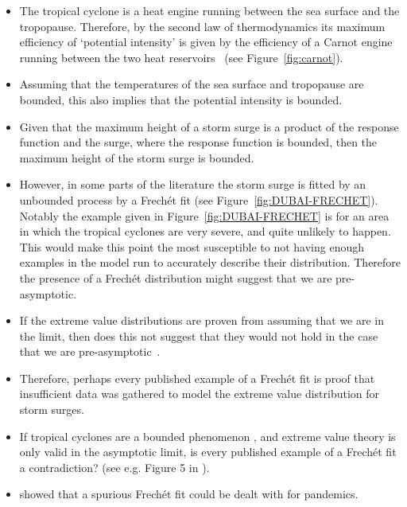 \documentclass[usenames, dvipsnames]{article}      %
\begin{document}
\begin{itemize}
    \item The tropical cyclone is a heat engine running between the 
          sea surface and the tropopause. Therefore, by the second law of
          thermodynamics its maximum efficiency of `potential intensity'
          is given by the efficiency of a Carnot engine running between
          the two heat reservoirs~\cite{emanuel1986air, emanuel1987dependence}
          (see Figure~\ref{fig:carnot}).
    
    \item Assuming that the temperatures of the sea surface
          and tropopause are bounded, this also implies that
          the potential intensity is bounded.
    
    \item Given that the maximum height of a storm surge is
          a product of the response function and the surge, 
          where the response function is bounded, then the
          maximum height of the storm surge is bounded.
    
    \item However, in some parts of the literature the storm surge
        is fitted by an unbounded process by a Frech\'et fit (see Figure~\ref{fig:DUBAI-FRECHET}).
        Notably the example given in Figure~\ref{fig:DUBAI-FRECHET}
        is for an area in which the tropical cyclones are very severe,
        and quite unlikely to happen.
        This would make this point the most susceptible to not having 
        enough examples in the model run to accurately
        describe their distribution. Therefore the presence of 
        a Frech\'et distribution might suggest that we are pre-asymptotic.
    
    \item If the extreme value distributions are proven from assuming that
        we are in the limit, then does this not suggest that they would not
        hold in the case that we are pre-asymptotic~\cite{Galambos1978TheStatistics}.
    
    \item Therefore, perhaps every published example of a Frech\'et fit
        is proof that insufficient data was gathered to model the
        extreme value distribution for storm surges.
    
    \item If tropical cyclones are a bounded phenomenon \cite{emanuel1986air}, and extreme value theory is only valid in the asymptotic limit, is every published example of a Frech\'et fit a contradiction? (see e.g. Figure 5 in \cite{Lin2015GreyCyclones}).
    
    \item \cite{Cirillo2020TailDiseases} showed that a spurious Frech\'et fit could be dealt with for pandemics.
    
    
    
\end{itemize}
\end{document}
